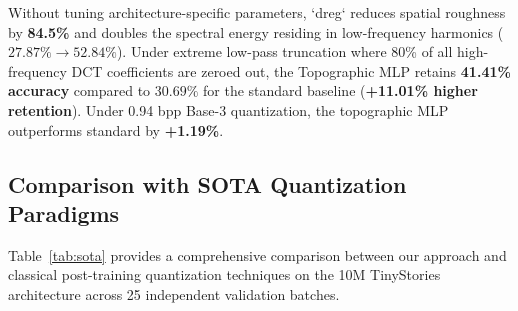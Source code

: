 \documentclass[11pt,a4paper]{article}
\begin{document}
\begin{table}[h]
    \centering
    \small
    \caption{\textbf{Beyond-Transformers Evaluation: MLP Classifier on MNIST.}}
    \label{tab:mnist}
\end{table}

Without tuning architecture-specific parameters, `dreg` reduces spatial roughness by \textbf{84.5\%} and doubles the spectral energy residing in low-frequency harmonics ($27.87\% \to 52.84\%$). Under extreme low-pass truncation where 80\% of all high-frequency DCT coefficients are zeroed out, the Topographic MLP retains \textbf{41.41\% accuracy} compared to $30.69\%$ for the standard baseline (\textbf{+11.01\% higher retention}). Under 0.94 bpp Base-3 quantization, the topographic MLP outperforms standard by \textbf{+1.19\%}.

\subsection{Comparison with SOTA Quantization Paradigms}
Table~\ref{tab:sota} provides a comprehensive comparison between our approach and classical post-training quantization techniques on the 10M TinyStories architecture across 25 independent validation batches.
\end{document}

